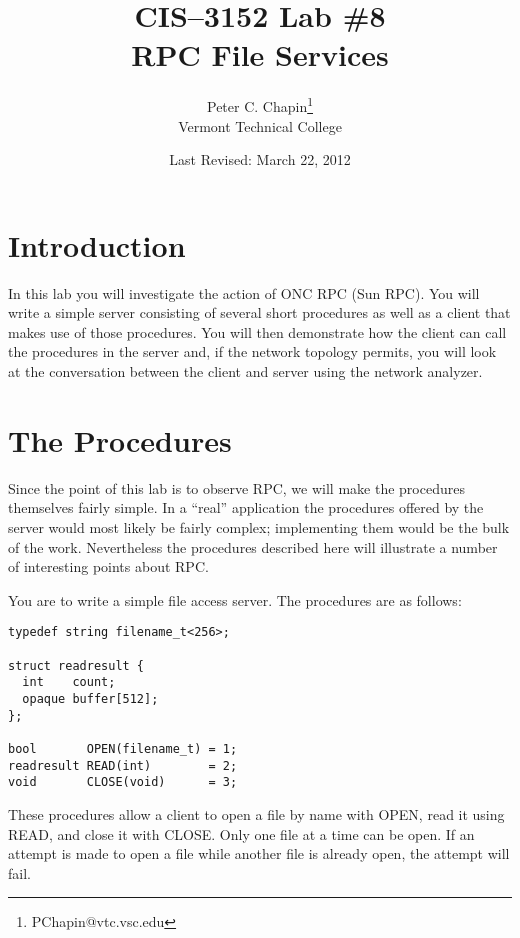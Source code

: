 \documentclass[twocolumn]{article}
\begin{document}
\title{CIS--3152 Lab \#8\\RPC File Services}
\author{Peter C. Chapin\thanks{PChapin@vtc.vsc.edu}\\
  Vermont Technical College}
\date{Last Revised: March 22, 2012}
\maketitle

\section*{Introduction}

In this lab you will investigate the action of ONC RPC (Sun RPC). You will write a simple server
consisting of several short procedures as well as a client that makes use of those procedures.
You will then demonstrate how the client can call the procedures in the server and, if the
network topology permits, you will look at the conversation between the client and server using
the network analyzer.

\section{The Procedures}

Since the point of this lab is to observe RPC, we will make the procedures themselves fairly
simple. In a ``real'' application the procedures offered by the server would most likely be
fairly complex; implementing them would be the bulk of the work. Nevertheless the procedures
described here will illustrate a number of interesting points about RPC.

You are to write a simple file access server. The procedures are as follows:

\begin{verbatim}
typedef string filename_t<256>;

struct readresult {
  int    count;
  opaque buffer[512];
};

bool       OPEN(filename_t) = 1;
readresult READ(int)        = 2;
void       CLOSE(void)      = 3;

\end{verbatim}

These procedures allow a client to open a file by name with OPEN, read it using READ, and close
it with CLOSE. Only one file at a time can be open. If an attempt is made to open a file while
another file is already open, the attempt will fail.
\end{document}
